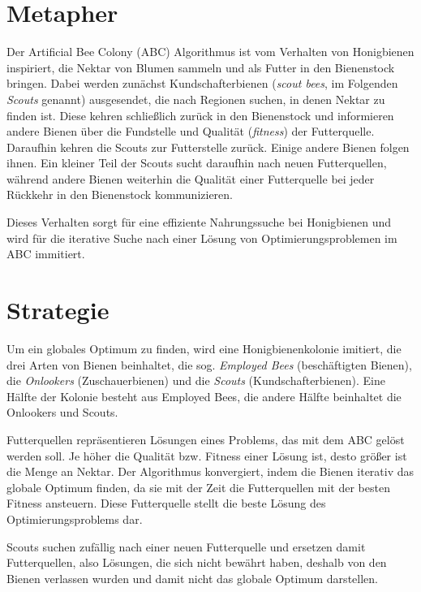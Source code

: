 
\section{Metapher}

Der Artificial Bee Colony (ABC) Algorithmus ist vom Verhalten von Honigbienen
inspiriert, die Nektar von Blumen sammeln und als Futter in den Bienenstock
bringen. Dabei werden zunächst Kundschafterbienen (\emph{scout bees}, im Folgenden
\emph{Scouts} genannt) ausgesendet, die nach Regionen suchen, in denen Nektar
zu finden ist. Diese kehren schließlich zurück in den Bienenstock und
informieren andere Bienen über die Fundstelle und Qualität (\emph{fitness})
der Futterquelle.
Daraufhin kehren die Scouts zur Futterstelle zurück. Einige andere Bienen
folgen ihnen. Ein kleiner Teil der Scouts sucht daraufhin nach neuen
Futterquellen, während andere Bienen weiterhin die Qualität einer
Futterquelle bei jeder Rückkehr in den Bienenstock kommunizieren.

Dieses Verhalten sorgt für eine effiziente Nahrungssuche bei Honigbienen und
wird für die iterative Suche nach einer Lösung von Optimierungsproblemen im
ABC immitiert.

\section{Strategie}

Um ein globales Optimum zu finden, wird eine Honigbienenkolonie imitiert, die
drei Arten von Bienen beinhaltet, die sog. \emph{Employed Bees} (beschäftigten
Bienen), die \emph{Onlookers} (Zuschauerbienen) und die \emph{Scouts}
(Kundschafterbienen). Eine Hälfte der Kolonie besteht aus Employed Bees, die
andere Hälfte beinhaltet die Onlookers und Scouts.

Futterquellen repräsentieren Lösungen eines Problems, das mit dem ABC
gelöst werden soll. Je höher die Qualität bzw. Fitness einer Lösung ist, desto
größer ist die Menge an Nektar. Der Algorithmus konvergiert, indem die Bienen
iterativ das globale Optimum finden, da sie mit der Zeit die Futterquellen mit
der besten Fitness ansteuern. Diese Futterquelle stellt die beste Lösung des
Optimierungsproblems dar.

Scouts suchen zufällig nach einer neuen Futterquelle und ersetzen damit
Futterquellen, also Lösungen, die sich nicht bewährt haben, deshalb von den
Bienen verlassen wurden und damit nicht das globale Optimum darstellen.

